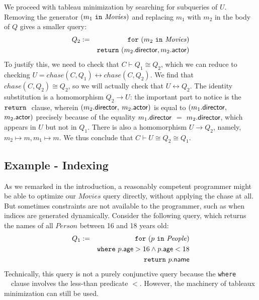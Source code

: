 \documentclass[preprint]{sigplanconf}
\newcommand{\FOR}{{\tt for} \ }
\newcommand{\WHERE}{{\tt where} \ }
\newcommand{\IN}{ \ {\tt in} \ }
\newcommand{\RETURN}{{\tt return} \ }
\newcommand{\relation}[1]{\ensuremath{\mathit{#1}}\xspace}
\begin{document}
We proceed with tableau minimization by searching for subqueries of $U$.
Removing the generator $(m_1 \IN \relation{Movies})$ and replacing $m_1$ with $m_2$ in the body of $Q$ gives a smaller query:
\begin{eqnarray*}
Q_2 & := & \FOR (m_2 \IN \relation{Movies}) \\
 & & \RETURN (m_2.{\sf director}, m_2.{\sf actor})
\end{eqnarray*}
To justify this, we need to check that $C \vdash Q_1 \cong Q_2$, which we can reduce to checking $U = chase(C,Q_1) \leftrightarrow chase(C, Q_2)$.
We find that $chase(C, Q_2) \cong Q_2$, so we will actually check that  $U \leftrightarrow Q_2$.
The identity substitution is a homomorphism $Q_2 \to U$: the important part to notice is the $\RETURN$ clause, wherein $(m_2.{\sf director},$ $m_2.{\sf actor})$ is equal to $(m_1.{\sf director},$ $m_2.{\sf actor})$ precisely because of the equality $m_1.{\sf director}$ $=$ $m_2.{\sf director}$, which appears in $U$ but not in $Q_1$.
There is also a homomorphism $U \to Q_2$, namely, $m_2 \mapsto m, m_1 \mapsto m$.  We thus conclude that $C \vdash U \cong Q_2 \cong Q_1$. 

\subsection*{Example - Indexing}
As we remarked in the introduction, a reasonably competent programmer might be able to optimize our \relation{Movies} query directly, without applying the chase at all.  But sometimes constraints are not available to the programmer, such as when indices are generated dynamically.  Consider the following query, which returns the names of all \relation{Person} between 16 and 18 years old:
\begin{eqnarray*}
Q_1 & := & \FOR (p \IN \relation{People}) \\
 & & \WHERE p.{\sf age} > 16 \wedge p.{\sf age} < 18 \\
 & & \RETURN p.{\sf name}
\end{eqnarray*}
Technically, this query is not a purely conjunctive query because the \WHERE\ clause involves the less-than predicate $<$.
However, the machinery of tableaux minimization can still be used.
\end{document}
